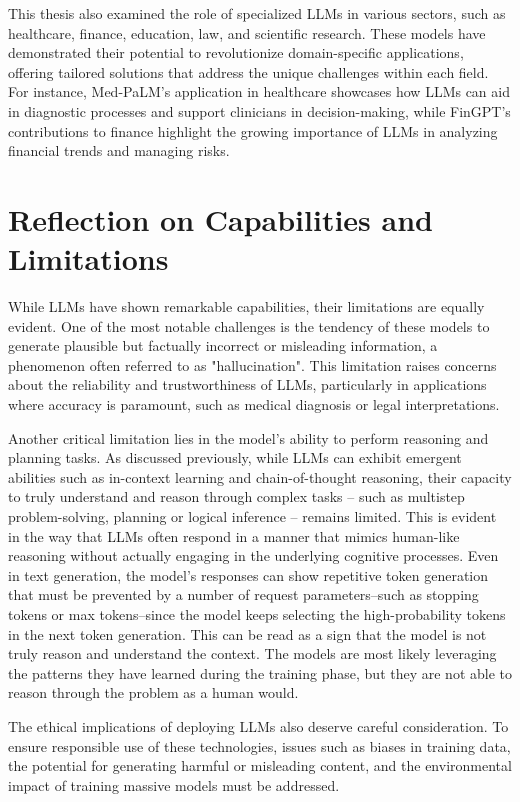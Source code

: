 This thesis also examined the role of specialized LLMs in various sectors, such as healthcare, finance, education, law, and scientific research.
These models have demonstrated their potential to revolutionize domain-specific applications, offering tailored solutions that address the unique challenges within each field.
For instance, Med-PaLM's application in healthcare showcases how LLMs can aid in diagnostic processes and support clinicians in decision-making, while FinGPT's contributions to finance highlight the growing importance of LLMs in analyzing financial trends and managing risks.

\section*{Reflection on Capabilities and Limitations}
While LLMs have shown remarkable capabilities, their limitations are equally evident.
One of the most notable challenges is the tendency of these models to generate plausible but factually incorrect or misleading information, a phenomenon often referred to as "hallucination".
This limitation raises concerns about the reliability and trustworthiness of LLMs, particularly in applications where accuracy is paramount, such as medical diagnosis or legal interpretations.

Another critical limitation lies in the model's ability to perform reasoning and planning tasks.
As discussed previously, while LLMs can exhibit emergent abilities such as in-context learning and chain-of-thought reasoning, their capacity to truly understand and reason through complex tasks -- such as multistep problem-solving, planning or logical inference -- remains limited.
This is evident in the way that LLMs often respond in a manner that mimics human-like reasoning without actually engaging in the underlying cognitive processes.
Even in text generation, the model's responses can show repetitive token generation that must be prevented by a number of request parameters--such as stopping tokens or max tokens--since the model keeps selecting the high-probability tokens in the next token generation.
This can be read as a sign that the model is not truly reason and understand the context.
The models are most likely leveraging the patterns they have learned during the training phase, but they are not able to reason through the problem as a human would.

The ethical implications of deploying LLMs also deserve careful consideration.
To ensure responsible use of these technologies, issues such as biases in training data, the potential for generating harmful or misleading content, and the environmental impact of training massive models must be addressed.


